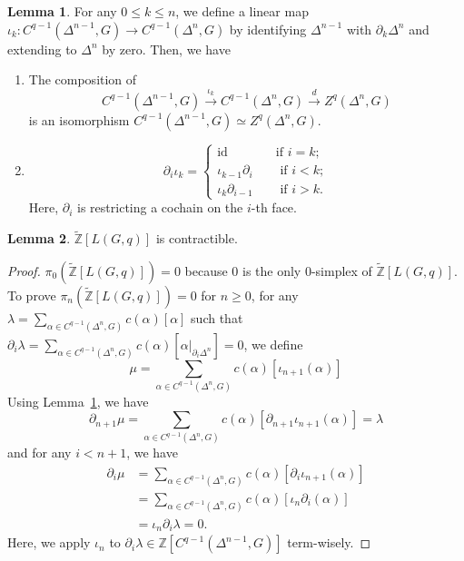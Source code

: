 \documentclass[reprint, amsmath, amssymb, showpacs, floatfix, longbibliography, aps, twocolumn, superscriptaddress, nofootinbib]{revtex4-2}
\newcommand{\ZZ}{{\mathbb Z}}
\newcommand{\tZ}{{\widetilde{\mathbb Z}}}
\newcommand{\id}{{\operatorname{id}}}
\theoremstyle{definition}
\newtheorem{lemma}{Lemma}[section]
\begin{document}
\begin{lemma}\label{lemmaCochainTool}
	For any $0\le k\le n$, we define a linear map $\iota_k:C^{q-1}(\Delta^{n-1},G)\rightarrow C^{q-1}(\Delta^{n},G)$ by identifying $\Delta^{n-1}$ with $\partial_k\Delta^n$ and extending to $\Delta^n$ by zero. Then, we have
	\begin{enumerate}
		\item The composition of 
		\begin{equation}
			C^{q-1}(\Delta^{n-1},G)\xrightarrow{\iota_k}C^{q-1}(\Delta^{n},G)\xrightarrow{d}Z^{q}(\Delta^{n},G)
		\end{equation}
		is an isomorphism $C^{q-1}(\Delta^{n-1},G)\simeq Z^{q}(\Delta^{n},G)$.
		\item 
		\begin{equation}
			\partial_i\iota_k=\left\{
			\begin{aligned}
				\id\quad \quad & \text{if } i=k;\\
				\iota_{k-1}\partial_i\quad & \text{   if } i<k;\\
				\iota_{k}\partial_{i-1}\quad  & \text{   if } i>k.
			\end{aligned}
			\right.
		\end{equation}
		Here, $\partial_i$ is restricting a cochain on the $i$-th face.
		
		
	\end{enumerate}
\end{lemma}

\begin{lemma}\label{lemmaL(G,q)Contractible}
	$\tZ[L(G,q)]$ is contractible.
\end{lemma}
\begin{proof}
	$\pi_0(\tZ[L(G,q)])=0$ because $0$ is the only $0$-simplex of $\tZ[L(G,q)]$. To prove $\pi_n(\tZ[L(G,q)])=0$ for $n\ge 0$, for any $\lambda=\sum_{\alpha\in C^{q-1}(\Delta^n,G)} c(\alpha)[\alpha]$ such that $\partial_i\lambda=\sum_{\alpha\in C^{q-1}(\Delta^n,G)} c(\alpha)[\alpha|_{\partial_i\Delta^n}]=0$, we define
	\begin{equation}
		\mu=\sum_{\alpha\in C^{q-1}(\Delta^n,G)} c(\alpha)[\iota_{n+1}(\alpha)]
	\end{equation}
	Using Lemma~\ref{lemmaCochainTool}, we have
	\begin{equation}
		\partial_{n+1}\mu=\sum_{\alpha\in C^{q-1}(\Delta^n,G)} c(\alpha)[\partial_{n+1}\iota_{n+1}(\alpha)]=\lambda
	\end{equation}
	and for any $i<n+1$, we have
	\begin{equation}
		\begin{aligned}
			\partial_{i}\mu&=\sum_{\alpha\in C^{q-1}(\Delta^n,G)} c(\alpha)[\partial_{i}\iota_{n+1}(\alpha)]\\&=\sum_{\alpha\in C^{q-1}(\Delta^n,G)} c(\alpha)[\iota_{n}\partial_i(\alpha)]\\&=\iota_n\partial_i\lambda=0.
		\end{aligned}
	\end{equation}
	Here, we apply $\iota_n$ to $\partial_i\lambda\in \ZZ[C^{q-1}(\Delta^{n-1},G)]$ term-wisely.
\end{proof}
\end{document}
